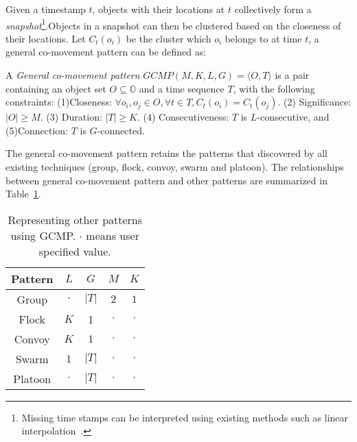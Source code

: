 Given a timestamp $t$, objects with their locations at $t$ collectively form a \emph{snapshot}\footnote{Missing time stamps can be interpreted using existing methods such as linear interpolation~\cite{jeung2008convoy}.}.Objects in a snapshot can then be clustered based on the
closeness of their locations. Let $C_t(o_i)$ be the cluster which $o_i$ belongs to at time $t$, a general co-movement pattern can be defined as:
\begin{definition}
A \emph{General co-movement pattern} $GCMP(M,K,L,G)= \langle O,T \rangle$ is a pair containing an object set $O\subseteq \mathbb{O}$ and a time sequence $T$, with the following constraints: (1)Closeness: $\forall o_i,o_j \in O, \forall t \in T, C_t(o_i) = C_t(o_j)$. (2) Significance: $|O| \geq M$. (3) Duration: $|T| \geq K$. (4) Consecutiveness: $T$ is $L$-consecutive, and (5)Connection: $T$ is $G$-connected.
\end{definition}

The general co-movement pattern retains the patterns that discovered by all 
existing techniques (group, flock, convoy, swarm and platoon). 
The relationships between general co-movement pattern and other patterns are summarized in Table~\ref{tbl:patterns}.
\begin{table}
\centering
\begin{tabular}{|c|c|c|c|c|}
\hline 
Pattern & $L$ & $G$ & $M$ & $K$ \\ 
\hline
Group & $\cdot$ & $|T|$ & $2$ & $1$ \\
\hline
Flock & $K$ & 1 & $\cdot$ & $\cdot$ \\
\hline 
Convoy & $K$ & $1$ & $\cdot$ & $\cdot$\\ 
\hline 
Swarm & $1$ & $|T|$ & $\cdot$ & $\cdot$ \\ 
\hline 
Platoon & $\cdot$ & $|T|$ & $\cdot$ & $\cdot$\\ 
\hline 
\end{tabular} 
\caption{Representing other patterns using GCMP. $\cdot$ means user specified value.}
\label{tbl:patterns}
\end{table}

